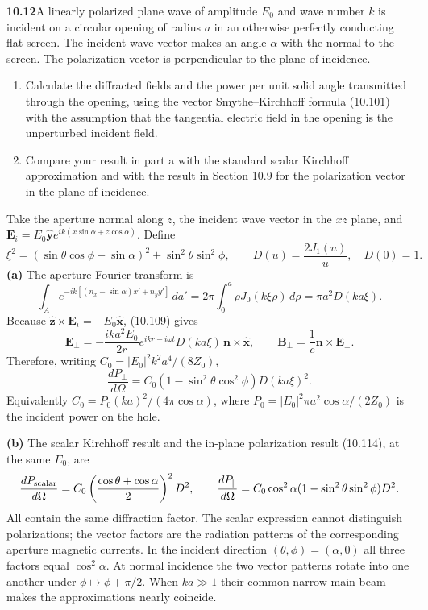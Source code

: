\par\bigskip
\noindent\textbf{10.12}\quad A linearly polarized plane wave of amplitude $E_{0}$ and wave number $k$ is incident on a circular opening of radius $a$ in an otherwise perfectly conducting flat screen. The incident wave vector makes an angle $\alpha$ with the normal to the screen. The polarization vector is perpendicular to the plane of incidence.
\begin{enumerate}
\item[(a)] Calculate the diffracted fields and the power per unit solid angle transmitted through the opening, using the vector Smythe--Kirchhoff formula (10.101) with the assumption that the tangential electric field in the opening is the unperturbed incident field.
\item[(b)] Compare your result in part a with the standard scalar Kirchhoff approximation and with the result in Section 10.9 for the polarization vector in the plane of incidence.
\end{enumerate}
\solution
Take the aperture normal along $z$, the incident wave vector in the
$xz$ plane, and $\mathbf E_i=E_0\widehat{\mathbf y}
e^{ik(x\sin\alpha+z\cos\alpha)}$. Define
\[
\xi^2=(\sin\theta\cos\phi-\sin\alpha)^2+
\sin^2\theta\sin^2\phi,\qquad
D(u)=\frac{2J_1(u)}u,\quad D(0)=1.
\]
\textbf{(a)} The aperture Fourier transform is
\[
\int_A e^{-ik[(n_x-\sin\alpha)x'+n_yy']}\,da'
=2\pi\int_0^a\rho J_0(k\xi\rho)\,d\rho
=\pi a^2D(ka\xi).
\]
Because $\widehat{\mathbf z}\times\mathbf E_i=-E_0\widehat{\mathbf x}$,
(10.109) gives
\[
\boxed{\mathbf E_{\perp}
=-\frac{ik a^2E_0}{2r}e^{ikr-i\omega t}
D(ka\xi)\,\mathbf n\times\widehat{\mathbf x},\qquad
\mathbf B_{\perp}=\frac1c\mathbf n\times\mathbf E_{\perp}.}
\]
Therefore, writing $C_0=|E_0|^2k^2a^4/(8Z_0)$,
\[
\boxed{\frac{dP_\perp}{d\Omega}
=C_0(1-\sin^2\theta\cos^2\phi)D(ka\xi)^2.}
\]
Equivalently $C_0=P_0(ka)^2/(4\pi\cos\alpha)$, where
$P_0=|E_0|^2\pi a^2\cos\alpha/(2Z_0)$ is the incident power on the hole.

\textbf{(b)} The scalar Kirchhoff result and the in-plane polarization
result (10.114), at the same $E_0$, are
\[
\frac{dP_{\rm scalar}}{d\Omega}
=C_0\left(\frac{\cos\theta+\cos\alpha}{2}\right)^2D^2,\qquad
\frac{dP_\parallel}{d\Omega}
=C_0\cos^2\alpha(1-\sin^2\theta\sin^2\phi)D^2.
\]
All contain the same diffraction factor. The scalar expression cannot
distinguish polarizations; the vector factors are the radiation patterns
of the corresponding aperture magnetic currents. In the incident
direction $(\theta,\phi)=(\alpha,0)$ all three factors equal
$\cos^2\alpha$. At normal incidence the two vector patterns rotate into
one another under $\phi\mapsto\phi+\pi/2$. When $ka\gg1$ their common
narrow main beam makes the approximations nearly coincide.

